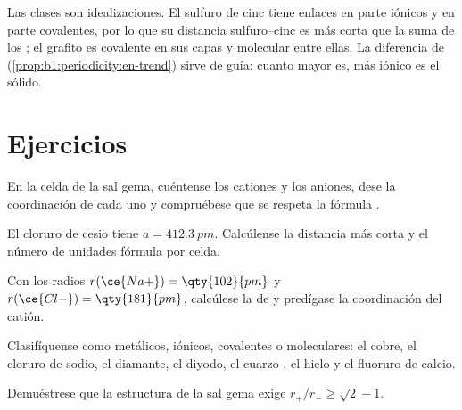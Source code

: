 \begin{remark}[Un continuo]\label{rem:b1:crystals-ionic-covalent:continuum}
Las clases son idealizaciones. El sulfuro de cinc tiene enlaces en parte
iónicos y en parte covalentes, por lo que su distancia sulfuro--cinc es
más corta que la suma de los ; el grafito es covalente en
sus capas y molecular entre ellas. La diferencia de 
(\cref{prop:b1:periodicity:en-trend}) sirve de guía: cuanto mayor es, más
iónico es el sólido.
\end{remark}

\section{Ejercicios}

\begin{exercise}[$\star$]\label{exo:b1:crystals-ionic-covalent:1}
En la celda de la sal gema, cuéntense los cationes y los aniones, dese la
coordinación de cada uno y compruébese que se respeta la fórmula
.
\end{exercise}

\begin{exercise}[$\star$]\label{exo:b1:crystals-ionic-covalent:2}
El cloruro de cesio tiene $a = \qty{412.3}{pm}$. Calcúlense la distancia
 más corta y el número de unidades fórmula por celda.
\end{exercise}

\begin{exercise}[$\star$]\label{exo:b1:crystals-ionic-covalent:3}
Con los radios $r(\ce{Na+}) = \qty{102}{pm}$ y $r(\ce{Cl-}) =
\qty{181}{pm}$, calcúlese la  de  y predígase
la coordinación del catión.
\end{exercise}

\begin{exercise}[$\star$]\label{exo:b1:crystals-ionic-covalent:4}
Clasifíquense como metálicos, iónicos, covalentes o moleculares: el
cobre, el cloruro de sodio, el diamante, el diyodo, el cuarzo ,
el hielo y el fluoruro de calcio.
\end{exercise}

\begin{exercise}[$\star\star$]\label{exo:b1:crystals-ionic-covalent:5}
Demuéstrese que la estructura de la sal gema exige $r_+/r_- \ge \sqrt2 - 1$.
\end{exercise}

